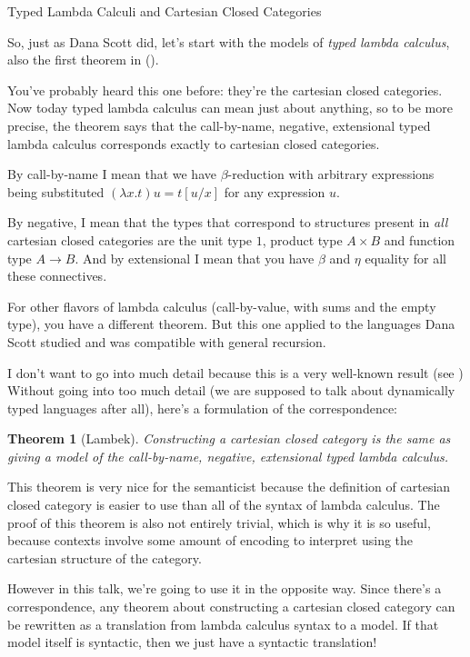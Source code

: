 \documentclass{article}
\newtheorem{theorem}{Theorem}
\begin{document}
\begin{section}{Typed Lambda Calculi and Cartesian Closed Categories}
  \label{section:ccc}

  So, just as Dana Scott did, let's start with the models of
  \emph{typed lambda calculus}, also the first theorem in
  (\cite{scott80relating}).

  You've probably heard this one before: they're the cartesian closed
  categories. Now today typed lambda calculus can mean just about
  anything, so to be more precise, the theorem says that the
  call-by-name, negative, extensional typed lambda calculus
  corresponds exactly to cartesian closed categories.

  By call-by-name I mean that we have $\beta$-reduction with arbitrary
  expressions being substituted $(\lambda{x}. {t}) u = t[u/x]$ for any
  expression $u$.

  By negative, I mean that the types that correspond to structures
  present in \emph{all} cartesian closed categories are the unit type
  $1$, product type $A\times B$ and function type $A \to B$.  And by
  extensional I mean that you have $\beta$ and $\eta$ equality for all
  these connectives.

  For other flavors of lambda calculus (call-by-value, with sums and
  the empty type), you have a different theorem. But this one applied
  to the languages Dana Scott studied and was compatible with general
  recursion.

  I don't want to go into much detail because this is a very
  well-known result (see \cite{lambek1988introduction}) Without going
  into too much detail (we are supposed to talk about dynamically
  typed languages after all), here's a formulation of the
  correspondence:
  \begin{theorem}[Lambek]
    Constructing a cartesian closed category is the same as giving a
    model of the call-by-name, negative, extensional typed lambda
    calculus.
  \end{theorem}

  This theorem is very nice for the semanticist because the definition
  of cartesian closed category is easier to use than all of the syntax
  of lambda calculus.  The proof of this theorem is also not entirely
  trivial, which is why it is so useful, because contexts involve some
  amount of encoding to interpret using the cartesian structure of the
  category.

  However in this talk, we're going to use it in the opposite
  way. Since there's a correspondence, any theorem about constructing
  a cartesian closed category can be rewritten as a translation from
  lambda calculus syntax to a model. If that model itself is
  syntactic, then we just have a syntactic translation!

\end{section}
\end{document}

